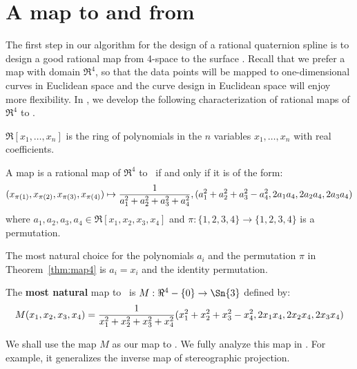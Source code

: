 \section{A map to and from }
\label{sec:map}

The first step in our algorithm for the design of a rational quaternion
spline is to design a good rational map from 4-space to the surface .
Recall that we prefer a map with domain $\Re^4$, so that the data points will be
mapped to one-dimensional curves in Euclidean space and the 
curve design in Euclidean space will enjoy more flexibility.
In \cite{jj98a}, we develop the following characterization of rational
maps of $\Re^4$ to .
%
\begin{defn2}
$\Re[x_1,\ldots,x_n]$ is the ring of polynomials in the $n$ variables
$x_1,\ldots,x_n$ with real coefficients.
\end{defn2}
%
\begin{theorem}
\label{thm:map4}
A map is a rational map of $\Re^4$ to \ if and only if
it is of the form:
\begin{equation}
\label{eq:re4s3}
\footnotesize{(x_{\pi(1)},x_{\pi(2)},x_{\pi(3)},x_{\pi(4)})} \mapsto 
\footnotesize{
	\frac{1}{a_1^2 + a_2^2 + a_3^2 + a_4^2},
	(a_1^2 + a_2^2 + a_3^2 - a_4^2, 2a_1a_4, 2a_2a_4, 2a_3a_4)
	}
\end{equation}
where $a_1,a_2,a_3,a_4 \in \Re[x_1,x_2,x_3,x_4]$
and $\pi : \{1,2,3,4\} \rightarrow \{1,2,3,4\}$ is a permutation.
\end{theorem}

\noindent The most natural choice for the polynomials $a_i$ and the permutation $\pi$ 
in Theorem~\ref{thm:map4} is $a_i = x_i$ and the identity permutation.
%
\begin{defn2}
The {\bf most natural} map to \ is 
$M: \Re^4 - \{0\} \rightarrow \Sn{3}$ defined by:
\begin{equation}
\label{eqM}
\footnotesize{
	M(x_1,x_2,x_3,x_4) =
	\frac{1}{x_1^2 + x_2^2 + x_3^2 + x_4^2}
	(x_1^2 + x_2^2 + x_3^2 - x_4^2, 2x_1x_4, 2x_2x_4, 2x_3x_4)
	 }
\end{equation}
\end{defn2}
%
We shall use the map $M$ as our map to .
We fully analyze this map in \cite{jj98b}.
For example, it generalizes the inverse map of stereographic projection.

